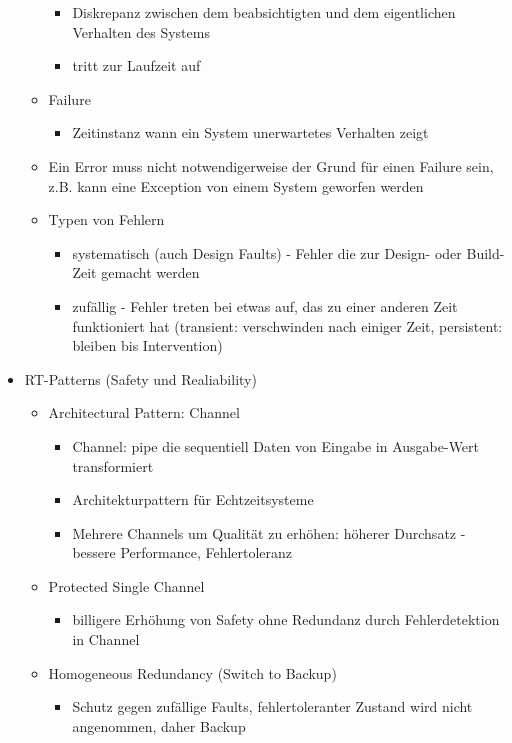 \documentclass[paper=a4, fontsize=11pt]{scrartcl} %
\numberwithin{equation}{section} %
\numberwithin{figure}{section} %
\numberwithin{table}{section} %
\begin{document}
\begin{itemize}
\begin{itemize}
\begin{itemize}
      \item Diskrepanz zwischen dem beabsichtigten und dem eigentlichen Verhalten des Systems
      \item tritt zur Laufzeit auf
    \end{itemize}
    \item Failure
    \begin{itemize}
      \item Zeitinstanz wann ein System unerwartetes Verhalten zeigt
    \end{itemize}
    \item Ein Error muss nicht notwendigerweise der Grund für einen Failure sein, z.B. kann eine Exception von einem System geworfen werden
    \item Typen von Fehlern
    \begin{itemize}
      \item systematisch (auch Design Faults) - Fehler die zur Design- oder Build-Zeit gemacht werden
      \item zufällig - Fehler treten bei etwas auf, das zu einer anderen Zeit funktioniert hat (transient: verschwinden nach einiger Zeit, persistent: bleiben bis Intervention)
    \end{itemize}
  \end{itemize}
  \item RT-Patterns (Safety und Realiability)
  \begin{itemize}
    \item Architectural Pattern: Channel
    \begin{itemize}
      \item Channel: pipe die sequentiell Daten von Eingabe in Ausgabe-Wert transformiert
      \item Architekturpattern für Echtzeitsysteme
      \item Mehrere Channels um Qualität zu erhöhen: höherer Durchsatz - bessere Performance, Fehlertoleranz
    \end{itemize}
    \item Protected Single Channel
    \begin{itemize}
      \item billigere Erhöhung von Safety ohne Redundanz durch Fehlerdetektion in Channel
    \end{itemize}
    \item Homogeneous Redundancy (Switch to Backup)
    \begin{itemize}
      \item Schutz gegen zufällige Faults, fehlertoleranter Zustand wird nicht angenommen, daher Backup

\end{itemize}
\end{itemize}
\end{itemize}
\end{document}
